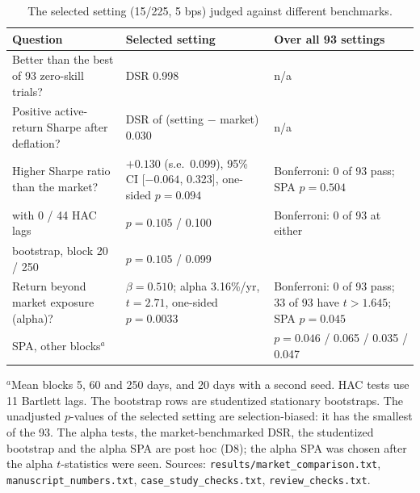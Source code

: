\documentclass[11pt,a4paper]{article}
\begin{document}
\begin{table}[htbp]
\centering\small
\begin{threeparttable}
\caption{The selected setting (15/225, 5 bps) judged against different benchmarks.}\label{tab:bench}
\begin{tabularx}{\textwidth}{@{}>{\raggedright\arraybackslash}p{4.6cm}>{\raggedright\arraybackslash}X>{\raggedright\arraybackslash}p{4.4cm}@{}}
\toprule
Question & Selected setting & Over all 93 settings \\
\midrule
Better than the best of 93 zero-skill trials? & DSR 0.998 & n/a \\
Positive active-return Sharpe after deflation? & DSR of (setting $-$ market) 0.030 & n/a \\
Higher Sharpe ratio than the market? & $+0.130$ (s.e.\ 0.099), 95\% CI [$-0.064$, 0.323], one-sided $p=0.094$ & Bonferroni: 0 of 93 pass; SPA $p=0.504$ \\
\quad with 0 / 44 HAC lags & $p=0.105$ / 0.100 & Bonferroni: 0 of 93 at either \\
\quad bootstrap, block 20 / 250 & $p=0.105$ / 0.099 & \\
Return beyond market exposure (alpha)? & $\beta=0.510$; alpha 3.16\%/yr, $t=2.71$, one-sided $p=0.0033$ & Bonferroni: 0 of 93 pass; 33 of 93 have $t>1.645$; SPA $p=0.045$ \\
\quad SPA, other blocks$^{a}$ & & $p=0.046$ / 0.065 / 0.035 / 0.047 \\
\bottomrule
\end{tabularx}
\begin{tablenotes}\footnotesize
\item $^{a}$Mean blocks 5, 60 and 250 days, and 20 days with a second seed. HAC tests use 11 Bartlett lags. The bootstrap rows are studentized stationary bootstraps. The unadjusted $p$-values of the selected setting are selection-biased: it has the smallest of the 93. The alpha tests, the market-benchmarked DSR, the studentized bootstrap and the alpha SPA are post hoc (D8); the alpha SPA was chosen after the alpha $t$-statistics were seen. Sources: \texttt{results/market\_comparison.txt}, \texttt{manuscript\_numbers.txt}, \texttt{case\_study\_checks.txt}, \texttt{review\_checks.txt}.
\end{tablenotes}
\end{threeparttable}
\end{table}
\end{document}
